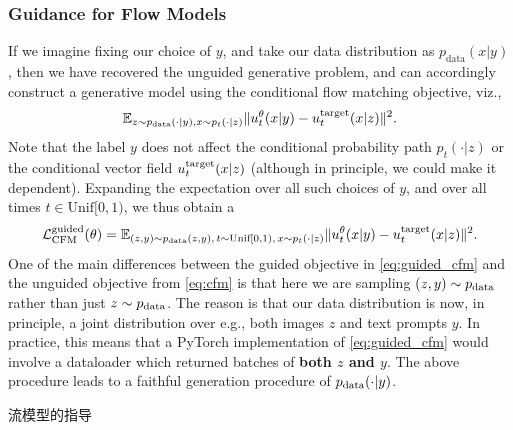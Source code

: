 \subsubsection{Guidance for Flow Models}
If we imagine fixing our choice of $y$, and take our data distribution as $p_{\text{data}}(x|y)$, then we have recovered the unguided generative problem, and can accordingly construct a generative model using the conditional flow matching objective, viz.,
\begin{equation}
    \mathbb{E}_{z \sim p_{\text{data}}(\cdot|y), x \sim p_t(\cdot|z)} \lVert u_t^{\theta}(x|y) - u^{\text{target}}_t(x|z)\rVert^2.
\end{equation}
Note that the label $y$ does not affect the conditional probability path $p_t(\cdot|z)$ or the conditional vector field $u^{\text{target}}_t(x|z)$ (although in principle, we could make it dependent). %
Expanding the expectation over all such choices of $y$, and over all times $t \in \text{Unif}[0,1)$, we thus obtain a 
\begin{equation}
    \label{eq:guided_cfm}
    \mathcal{L}_{\text{CFM}}^{\text{guided}}(\theta) = \mathbb{E}_{(z,y) \sim p_{\text{data}}(z,y),\,t\sim \text{Unif}[0,1),\,x\sim p_t(\cdot|z)} \lVert u_t^{\theta}(x|y) - u^{\text{target}}_t(x|z)\rVert^2.
\end{equation}
One of the main differences between the guided objective in \cref{eq:guided_cfm} and the unguided objective from \cref{eq:cfm} is that here we are sampling $(z,y) \sim p_{\rm{data}}$ rather than just $z \sim p_{\rm{data}}$. The reason is that our data distribution is now, in principle, a joint distribution over e.g., both images $z$ and text prompts $y$. In practice, this means that a PyTorch implementation of \cref{eq:guided_cfm} would involve a dataloader which returned batches of \textbf{both $z$ and $y$}. The above procedure leads to a faithful generation procedure of $p_{\rm{data}}(\cdot|y)$.

流模型的指导

